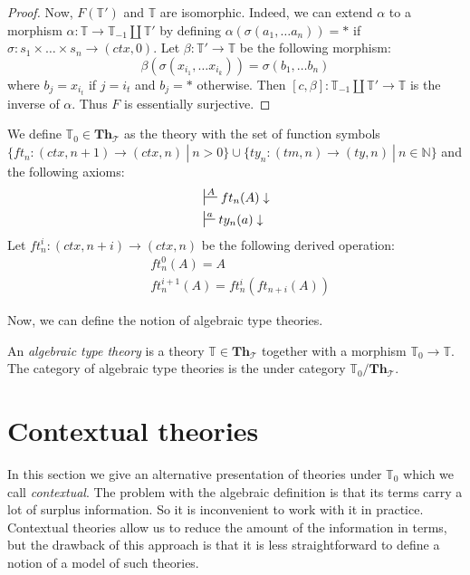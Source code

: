 \documentclass[reqno]{amsart}
\theoremstyle{definition}
\theoremstyle{remark}
\newcommand{\cat}[1]{\mathbf{#1}}
\newcommand{\Th}{\cat{Th}}
\newcommand{\ThT}{\Th_{\mathcal{T}}}
\numberwithin{figure}{section}
\begin{document}
\begin{proof}
Now, $F(\mathbb{T}')$ and $\mathbb{T}$ are isomorphic.
Indeed, we can extend $\alpha$ to a morphism $\alpha : \mathbb{T} \to \mathbb{T}_{-1} \amalg \mathbb{T}'$
by defining $\alpha(\sigma(a_1, \ldots a_n)) = *$ if $\sigma : s_1 \times \ldots \times s_n \to (ctx,0)$.
Let $\beta : \mathbb{T}' \to \mathbb{T}$ be the following morphism:
\[ \beta(\sigma(x_{i_1}, \ldots x_{i_k})) = \sigma(b_1, \ldots b_n) \]
where $b_j = x_{i_t}$ if $j = i_t$ and $b_j = *$ otherwise.
Then $[c,\beta] : \mathbb{T}_{-1} \amalg \mathbb{T}' \to \mathbb{T}$ is the inverse of $\alpha$.
Thus $F$ is essentially surjective.
\end{proof}

We define $\mathbb{T}_0 \in \ThT$ as the theory with the set of function symbols $\{ ft_n : (ctx,n+1) \to (ctx,n)\ |\ n > 0 \} \cup \{ ty_n : (tm,n) \to (ty,n)\ |\ n \in \mathbb{N} \}$ and the following axioms:
\begin{align*}
& \sststile{}{A} ft_n(A) \downarrow \\
& \sststile{}{a} ty_n(a) \downarrow
\end{align*}
Let $ft^i_n : (ctx,n+i) \to (ctx,n)$ be the following derived operation:
\begin{align*}
& ft^0_n(A) = A \\
& ft^{i+1}_n(A) = ft^i_n(ft_{n+i}(A))
\end{align*}

Now, we can define the notion of algebraic type theories.

\begin{defn}
An \emph{algebraic type theory} is a theory $\mathbb{T} \in \ThT$ together with a morphism $\mathbb{T}_0 \to \mathbb{T}$.
The category of algebraic type theories is the under category $\mathbb{T}_0/\ThT$.
\end{defn}

\section{Contextual theories}

In this section we give an alternative presentation of theories under $\mathbb{T}_0$ which we call \emph{contextual}.
The problem with the algebraic definition is that its terms carry a lot of surplus information.
So it is inconvenient to work with it in practice.
Contextual theories allow us to reduce the amount of the information in terms,
but the drawback of this approach is that it is less straightforward to define a notion of a model of such theories.
\end{document}
